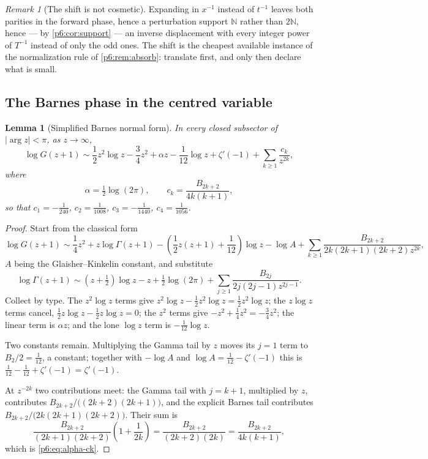 \documentclass[11pt,a4paper,oneside]{book}
\theoremstyle{plain}
\newtheorem{lemma}[theorem]{Lemma}
\theoremstyle{definition}
\theoremstyle{remark}
\newtheorem{remark}[theorem]{Remark}
\newcommand{\Nat}{\mathbb{N}}
\begin{document}
\begin{remark}[The shift is not cosmetic]\label{p6:rem:why-half-shift}
Expanding in $x^{-1}$ instead of $t^{-1}$ leaves both parities in the forward
phase, hence a perturbation support $\Nat$ rather than $2\Nat$, hence --- by
\cref{p6:cor:support} --- an inverse displacement with every integer power of
$T^{-1}$ instead of only the odd ones.  The shift is the cheapest available
instance of the normalization rule of \cref{p6:rem:absorb}: translate first,
and only then declare what is small.
\end{remark}

\subsection{The Barnes phase in the centred variable}

\begin{lemma}[Simplified Barnes normal form]
\label{p6:lem:barnes-normal-form}
In every closed subsector of $|\arg z|<\pi$, as $z\to\infty$,
\begin{equation}\label{p6:eq:barnes-normal}
 \log G(z+1)
 \sim\frac12z^{2}\log z-\frac34z^{2}
 +\alpha z-\frac1{12}\log z+\zeta'(-1)
 +\sum_{k\ge1}\frac{c_k}{z^{2k}},
\end{equation}
where
\begin{equation}\label{p6:eq:alpha-ck}
 \alpha=\tfrac12\log(2\pi),
 \qquad
 c_k=\frac{B_{2k+2}}{4k(k+1)},
\end{equation}
so that
$c_1=-\tfrac1{240}$, $c_2=\tfrac1{1008}$, $c_3=-\tfrac1{1440}$,
$c_4=\tfrac1{1056}$.
\end{lemma}

\begin{proof}
Start from the classical form
\[
 \log G(z+1)
 \sim\frac14z^{2}+z\log\Gamma(z+1)
 -\left(\frac12z(z+1)+\frac1{12}\right)\log z-\log A
 +\sum_{k\ge1}\frac{B_{2k+2}}{2k(2k+1)(2k+2)z^{2k}},
\]
$A$ being the Glaisher--Kinkelin constant, and substitute
\[
 \log\Gamma(z+1)
 \sim\left(z+\tfrac12\right)\log z-z+\tfrac12\log(2\pi)
 +\sum_{j\ge1}\frac{B_{2j}}{2j(2j-1)z^{2j-1}} .
\]
Collect by type.  The $z^{2}\log z$ terms give
$z^2\log z-\tfrac12z^2\log z=\tfrac12z^2\log z$; the $z\log z$ terms cancel,
$\tfrac12z\log z-\tfrac12z\log z=0$; the $z^{2}$ terms give
$-z^{2}+\tfrac14z^{2}=-\tfrac34z^{2}$; the linear term is $\alpha z$; and the
lone $\log z$ term is $-\tfrac1{12}\log z$.

Two constants remain.  Multiplying the Gamma tail by $z$ moves its $j=1$ term
to $B_2/2=\tfrac1{12}$, a constant; together with $-\log A$ and
$\log A=\tfrac1{12}-\zeta'(-1)$ this is
$\tfrac1{12}-\tfrac1{12}+\zeta'(-1)=\zeta'(-1)$.

At $z^{-2k}$ two contributions meet: the Gamma tail with $j=k+1$, multiplied
by $z$, contributes $B_{2k+2}/\bigl((2k+2)(2k+1)\bigr)$, and the explicit
Barnes tail contributes $B_{2k+2}/\bigl(2k(2k+1)(2k+2)\bigr)$.  Their sum is
\[
 \frac{B_{2k+2}}{(2k+1)(2k+2)}\left(1+\frac1{2k}\right)
 =\frac{B_{2k+2}}{(2k+2)(2k)}
 =\frac{B_{2k+2}}{4k(k+1)},
\]
which is \eqref{p6:eq:alpha-ck}.
\end{proof}
\end{document}

